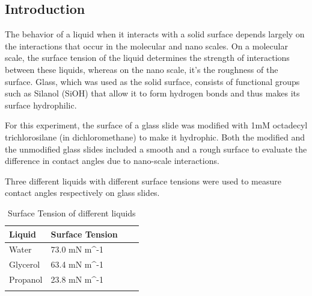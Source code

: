 \documentclass[pdflatex,sn-mathphys]{sn-jnl}%
\theoremstyle{thmstyleone}%
\theoremstyle{thmstyletwo}%
\theoremstyle{thmstylethree}%
\begin{document}
\subsection{Introduction}\label{subsec2}

The behavior of a liquid when it interacts with a solid surface depends largely on the interactions that occur in the molecular and nano scales. On  a molecular scale, the surface tension of the liquid determines the strength of interactions between these liquids, whereas on the nano scale, it's the roughness of the surface. Glass, which was used as the solid surface, consists of functional groups such as Silanol (SiOH) that allow it to form hydrogen bonds and thus makes its surface hydrophilic. 

For this experiment, the surface of a glass slide was modified with 1mM octadecyl trichlorosilane (in dichloromethane) to make it hydrophic. Both the modified and the unmodified glass slides included a smooth and a rough surface to evaluate the difference in contact angles due to nano-scale interactions.

Three different liquids with different surface tensions were used to measure contact angles respectively on glass slides.

\begin{table}[h]
\begin{center}
\begin{minipage}{174pt}
\caption{Surface Tension of different liquids}\label{tab1}%
\begin{tabular}{@{}llll@{}}
\toprule
Liquid & Surface Tension\\
\midrule
Water    & 73.0 mN m^{-1}  \\
Glycerol    & 63.4 mN m^{-1}  \\
Propanol    & 23.8 mN m^{-1}  \\
\botrule
\end{tabular}
\end{minipage}
\end{center}
\end{table}
\end{document}
